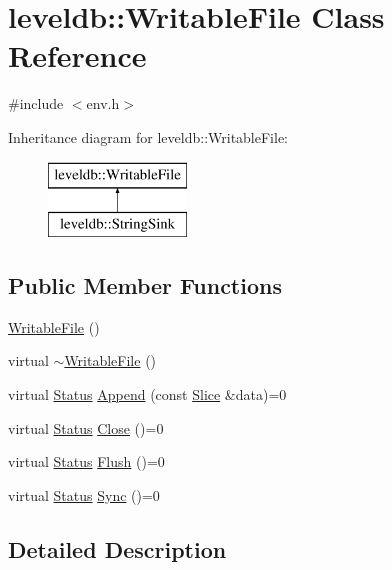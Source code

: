 \hypertarget{classleveldb_1_1_writable_file}{}\section{leveldb\+:\+:Writable\+File Class Reference}
\label{classleveldb_1_1_writable_file}


{\ttfamily \#include $<$env.\+h$>$}

Inheritance diagram for leveldb\+:\+:Writable\+File\+:\begin{figure}[H]
\begin{center}
\leavevmode
\includegraphics[height=2.000000cm]{classleveldb_1_1_writable_file}
\end{center}
\end{figure}
\subsection*{Public Member Functions}
\begin{DoxyCompactItemize}
\item 
\hyperlink{classleveldb_1_1_writable_file_a48e7bcecb75e0339f0dafedb41c058ee}{Writable\+File} ()
\item 
virtual \hyperlink{classleveldb_1_1_writable_file_a6a2f4698544f04288fbee6ef354dd71d}{$\sim$\+Writable\+File} ()
\item 
virtual \hyperlink{classleveldb_1_1_status}{Status} \hyperlink{classleveldb_1_1_writable_file_a53b41841d9577d28f65d4d90e1660de8}{Append} (const \hyperlink{classleveldb_1_1_slice}{Slice} \&data)=0
\item 
virtual \hyperlink{classleveldb_1_1_status}{Status} \hyperlink{classleveldb_1_1_writable_file_a2efbf9c02a26028b5002df73b4393915}{Close} ()=0
\item 
virtual \hyperlink{classleveldb_1_1_status}{Status} \hyperlink{classleveldb_1_1_writable_file_ab95759ad32f6a05b0ee4266969fa265e}{Flush} ()=0
\item 
virtual \hyperlink{classleveldb_1_1_status}{Status} \hyperlink{classleveldb_1_1_writable_file_a2d2dcef02a2c9e71f3d39125bcd5a606}{Sync} ()=0
\end{DoxyCompactItemize}


\subsection{Detailed Description}


